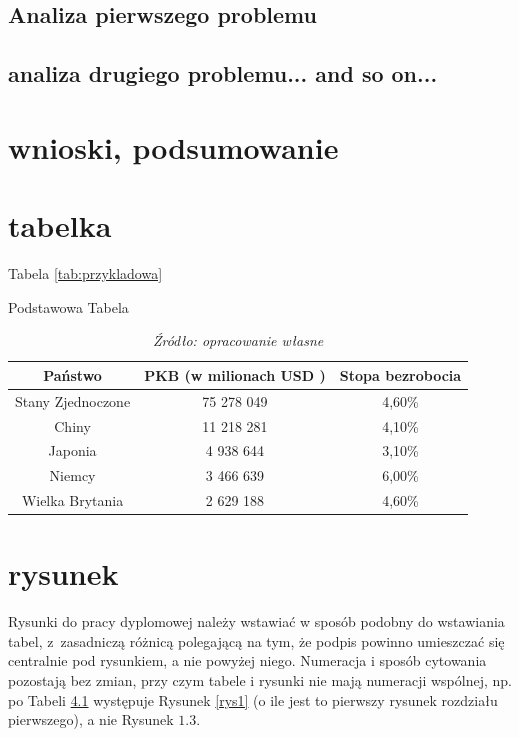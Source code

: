 \documentclass[inzynierska]{pwr_wmat_praca_dyplomowa}
\theoremstyle{plain}
\numberwithin{theorem}{chapter}
\theoremstyle{definition}
\numberwithin{theorem}{chapter}
\begin{document}
\section{Analiza pierwszego problemu}
\section{analiza drugiego problemu...  and so on...}
\chapter{wnioski, podsumowanie}

\chapter{tabelka}
Tabela \ref{tab:przykladowa} 
\begin{table}[H]
	\caption{Podstawowa Tabela}
	\centering
	\begin{tabular}{ccc}
		\hline
		\hline                       
		Państwo & PKB (w milionach USD )& Stopa bezrobocia  \\  [0.5ex] 
		\hline 
		Stany Zjednoczone & 75 278 049 & 4,60\%  \\
		Chiny & 11 218 281 & 4,10\%   \\
		Japonia & 4 938 644 & 3,10\%  \\
		Niemcy & 3 466 639 & 6,00\%   \\
		Wielka Brytania & 2 629 188 & 4,60\%  \\ [1ex]  
		\hline 
	\end{tabular}
	\caption*{\textit{Źródło: opracowanie własne}}
	\label{tab:przykladowa2} 
\end{table}
\chapter{rysunek}
Rysunki do pracy dyplomowej należy wstawiać w sposób podobny do wstawiania tabel, z~zasadniczą różnicą polegającą na tym, że podpis powinno umieszczać się centralnie pod rysunkiem, a nie powyżej niego. Numeracja i sposób cytowania pozostają bez zmian, przy czym tabele i rysunki nie mają numeracji wspólnej, np. po Tabeli \ref{tab:przykladowa2} występuje Rysunek \ref{rys1} (o ile jest to pierwszy rysunek rozdziału pierwszego), a nie Rysunek $1.3$.
\end{document}
